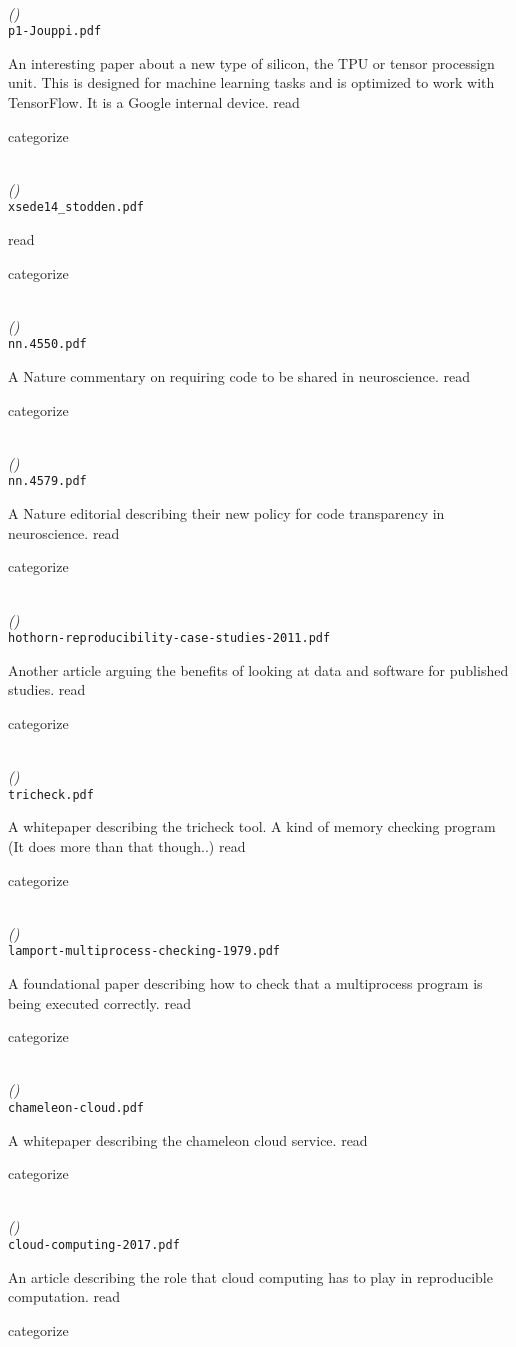 \documentclass[american]{article}
\newcommand{\Read}{
	\gls{read}
}
\newcommand{\categorize}{
	\gls{categorize}
}
\newenvironment{refdef}[2] {
	\noindent \textbf{\citetitle{#1}} \cite{#1}\\ \citejournalorbooktitle{#1} \textit{(\citeyear{#1})}\\ \texttt{#2} \vspace{0.2in} \par 
} {
\vspace{0.2in}
}
\begin{document}
\begin{refdef}{jouppi-tpu-performance-2017}{p1-Jouppi.pdf}
An interesting paper about a new type of silicon, the TPU or tensor processign unit. This is designed for machine learning tasks and is optimized to work with TensorFlow. It is a Google internal device. \Read \categorize
\end{refdef}

\begin{refdef}{stodden-provisioning-repro-science-2014}{xsede14\_stodden.pdf}
\Read \categorize
\end{refdef}

\begin{refdef}{Eglen2017}{nn.4550.pdf}
A Nature commentary on requiring code to be shared in neuroscience. \Read \categorize
\end{refdef}

\begin{refdef}{nature-transparency-2017}{nn.4579.pdf}
A Nature editorial describing their new policy for code transparency in neuroscience. \Read \categorize
\end{refdef}

\begin{refdef}{hothorn-reproducibility-case-studies-2011}{hothorn-reproducibility-case-studies-2011.pdf}
Another article arguing the benefits of looking at data and software for published studies. \Read \categorize
\end{refdef}

\begin{refdef}{tricheck}{tricheck.pdf}
A whitepaper describing the tricheck tool. A kind of memory checking program (It does more than that though..) \Read \categorize
\end{refdef}

\begin{refdef}{lamport-multiprocess-checking-1979}{lamport-multiprocess-checking-1979.pdf}
A foundational paper describing how to check that a multiprocess program is being executed correctly. \Read \categorize
\end{refdef}

\begin{refdef}{chameleon-cloud}{chameleon-cloud.pdf}
A whitepaper describing the chameleon cloud service. \Read \categorize
\end{refdef}

\begin{refdef}{deOliveira2017}{cloud-computing-2017.pdf}
An article describing the role that cloud computing has to play in reproducible computation. \Read \categorize
\end{refdef}
\end{document}
